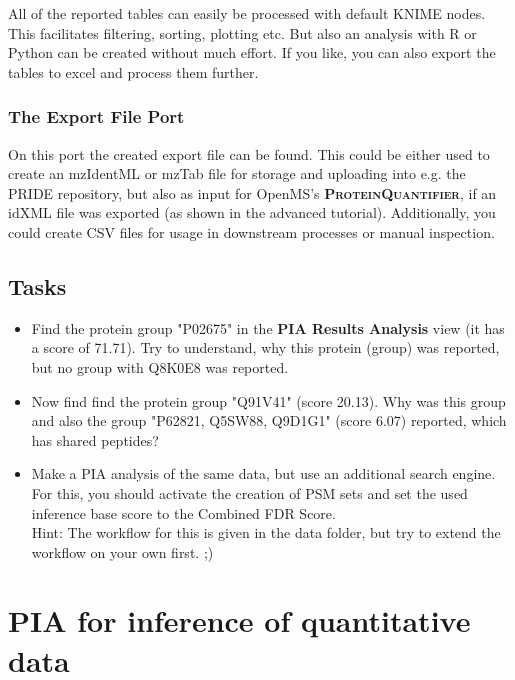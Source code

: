 \documentclass[a4paper,11pt,twoside]{article}
\newcommand{\knimenode}[1]{{\scshape\bfseries #1}}
\begin{document}
All of the reported tables can easily be processed with default KNIME nodes.
This facilitates filtering, sorting, plotting etc. But also an analysis with R
or Python can be created without much effort. If you like, you can also export
the tables to excel and process them further.


\subsubsection{The Export File Port}

On this port the created export file can be found. This could be either used
to create an mzIdentML or mzTab file for storage and uploading into e.g. the
PRIDE repository, but also as input for OpenMS's \knimenode{ProteinQuantifier},
if an idXML file was exported (as shown in the advanced tutorial).
Additionally, you could create CSV files for usage in downstream processes or
manual inspection.


\subsection{Tasks}

\begin{itemize}
	\item Find the protein group "P02675" in the \textbf{PIA Results Analysis}
	view (it has a score of 71.71). Try to understand, why this protein (group)
	was reported, but no group with Q8K0E8 was reported.

	\item Now find find the protein group "Q91V41" (score 20.13). Why
	was this group and also the group "P62821, Q5SW88, Q9D1G1" (score 6.07)
	reported, which has shared peptides?

	\item Make a PIA analysis of the same data, but use an additional search
	engine. For this, you should activate the creation of PSM sets and set the
	used inference base score to the Combined FDR Score.\\
	Hint: The workflow for this is given in the data folder, but try to extend the
	workflow on your own first. ;)
\end{itemize}



\newpage
\section{PIA for inference of quantitative data}
\end{document}
